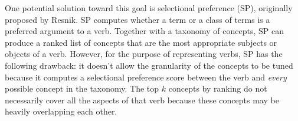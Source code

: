 One potential solution toward this goal is selectional preference
(SP), originally proposed by Resnik.
SP computes whether a term or a class of terms is a preferred argument
to a verb. Together with a taxonomy of concepts,
SP can produce a ranked list of concepts that are the most appropriate
subjects or objects of a verb. However, for the purpose of representing verbs,
SP has the following drawback: it doesn't allow the granularity of the concepts
to be tuned because it computes a selectional preference score between the
verb and {\em every} possible concept in the taxonomy. The top $k$ concepts by
ranking do not necessarily cover all the aspects of that verb because these
concepts may be heavily overlapping each other.
%



